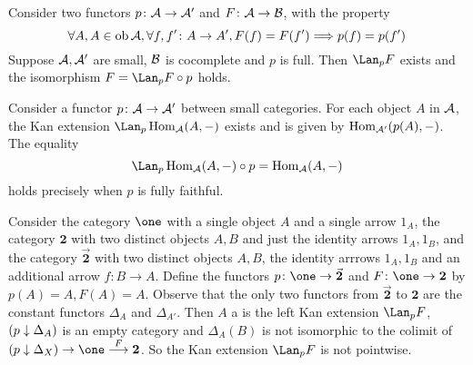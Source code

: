   \begin{ex}
    Consider two functors $p\colon{\cal A}\to{\cal A}'$ and $F\colon{\cal A}\to{\cal B}$, with the property
    \begin{equation*}
      \forall A,A\in\operatorname{ob}{\cal A}, \forall f,f'\colon A\to A',  F(f)=F(f')\Longrightarrow p(f)=p(f')
    \end{equation*}
    Suppose ${\cal A},{\cal A}'$ are small, ${\cal B}$ is cocomplete and $p$ is full. 
    Then $\Lan_pF$ exists and the isomorphism $F = \Lan_pF \circ p$ holds.
  \end{ex}
  \begin{ex}
    Consider a functor $p\colon{\cal A}\to{\cal A}'$ between small categories. For each object $A$ in ${\cal A}$, the Kan extension $\Lan_p\Hom_{\Aa}(A,-)$ exists and is given by 
    $\operatorname{Hom}_{{\cal A}'}(p(A),-)$.%
    The equality 
    \begin{equation*}
      \Lan_p\Hom_{\Aa}(A,-)\circ p = \Hom_{\Aa}(A,-)
    \end{equation*}
    holds precisely when $p$ is fully faithful.
  \end{ex}
  \begin{ex}
    Consider the category $\one$ with a single object $A$ and a single arrow $1_A$, the category $\mathbf{2}$ with two distinct objects $A, B$ and just the identity arrows $1_A,1_B$, and the category $\vec{\mathbf{2}}$ with two distinct objects $A, B$, the identity arrrows $1_A, 1_B$ and an additional arrow $f\colon B \to A$. 
    Define the functors $p\colon \one \to \vec{\mathbf{2}}$ and $F\colon \one \to \mathbf{2}$ by $p(A) = A, F(A) = A$. 
    Observe that the only two functors from $\vec{\mathbf{2}}$ to $\mathbf{2}$ are the constant functors $\Delta_A$ and $\Delta_{A'}$. Then $A$ a is the left Kan extension $\Lan_pF$, $(p\downarrow\Delta_A)$ is an empty category and $\Delta_A(B)$ is not isomorphic to the colimit of $(p\down\Delta_X)\to\one\markar{F}\mathbf{2}$. So the Kan extension $\Lan_pF$ is not pointwise.
  \end{ex}